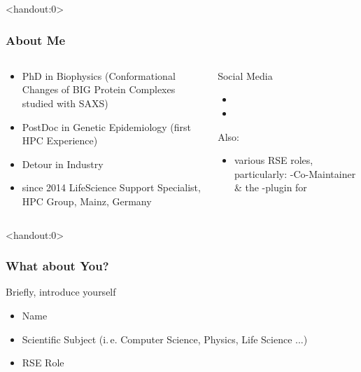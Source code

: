 \begin{frame}<handout:0>
	\frametitle{About Me}
	\begin{columns}
		\begin{column}{0.5\textwidth}
		   \begin{itemize}
		   	 \item PhD in Biophysics (Conformational Changes of BIG Protein Complexes studied with SAXS)
		   	 \item PostDoc in Genetic Epidemiology (first HPC Experience)
		   	 \item Detour in Industry
		   	 \item since 2014 LifeScience Support Specialist, HPC Group, Mainz, Germany
		   	 
		   \end{itemize}
		\end{column}
	    \begin{column}{0.5\textwidth}
	    	Social Media
	    	\begin{itemize}
	    		\item {}
	    		\item {}
	    	\end{itemize}
    	    \pause
    	    Also:
    	    \begin{itemize}
    	    	\item various RSE roles, particularly: \Snakemake{}-Co-Maintainer \& the \slurm-plugin for \Snakemake
    	    \end{itemize}
	    \end{column}
	\end{columns}
\end{frame}

\begin{frame}<handout:0>
	\frametitle{What about You?}
	\begin{question}{
		Briefly, introduce yourself
		\begin{itemize}
			\item Name
			\item Scientific Subject (i.\,e. Computer Science, Physics, Life Science ...)
			\item RSE Role
		\end{itemize}}
	\end{question}
\end{frame}